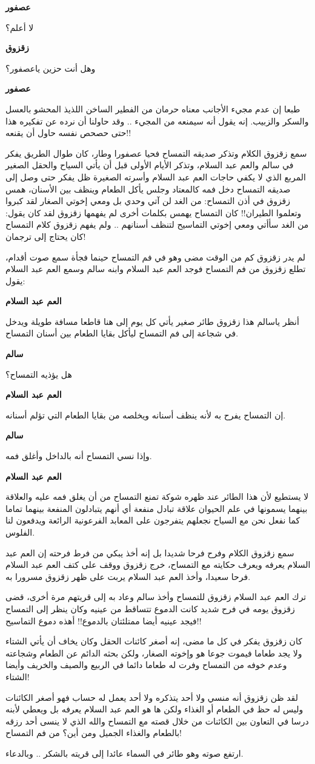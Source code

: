 \documentclass[12pt]{article}
\newlength{\SpeakerGutter}
\newlength{\DialogueGap}
\newlength{\StoryBodyWidth}
\newcommand{\Narration}[1]{%
  \par
  \noindent
  \begin{minipage}[t]{\StoryBodyWidth}
    \RaggedLeft
    #1
  \end{minipage}
  \par
}
\newcommand{\DialogueLine}[2]{%
  \par\addvspace{0.75\baselineskip}
  \noindent
  \begin{minipage}[t]{\SpeakerGutter}
    \RaggedLeft
    \bfseries #1
  \end{minipage}%
  \hspace{\DialogueGap}%
  \begin{minipage}[t]{\StoryBodyWidth}
    \RaggedLeft
    #2
  \end{minipage}%
  \par
}
\newcommand{\TextOnlyPage}[1]{%
  \clearpage
  \thispagestyle{empty}
  \vspace*{2mm}
  #1
  \clearpage
}
\begin{document}
\TextOnlyPage{%
  \DialogueLine{عصفور}{لا أعلم؟}
  \DialogueLine{زقزوق}{وهل أنت حزين ياعصفور؟}
  \DialogueLine{عصفور}{طبعا إن عدم مجيء الأجانب معناه حرمان من الفطير الساخن اللذيذ المحشو بالعسل والسكر والزبيب. إنه يقول أنه سيمنعه من المجيء .. وقد حاولنا أن نرده عن تفكيره هذا حتى حصحص نفسه حاول أن يقنعه!!}
  \Narration{سمع زقزوق الكلام وتذكر صديقه التمساح فحيا عصفورا وطار، كان طوال الطريق يفكر في سالم والعم عبد السلام، وتذكر الأيام الأولى قبل أن يأتي السياح والحقل الصغير المربع الذي لا يكفي حاجات العم عبد السلام وأسرته الصغيرة ظل يفكر حتى وصل إلى صديقه التمساح دخل فمه كالمعتاد وجلس يأكل الطعام وينظف بين الأسنان، همس زقزوق في أذن التمساح: من الغد لن آتي وحدي بل ومعي إخوتي الصغار لقد كبروا وتعلموا الطيران!! كان التمساح يهمس بكلمات أخرى لم يفهمها زقزوق لقد كان يقول: من الغد سأأتي ومعي إخوتي التماسيح لتنظف أسنانهم .. ولم يفهم زقزوق كلام التمساح كان يحتاج إلى ترجمان!}
  \Narration{لم يدر زقزوق كم من الوقت مضى وهو في فم التمساح حينما فجأة سمع صوت أقدام، تطلع زقزوق من فم التمساح فوجد العم عبد السلام وابنه سالم وسمع العم عبد السلام يقول:}
  \DialogueLine{العم عبد السلام}{أنظر ياسالم هذا زقزوق طائر صغير يأتي كل يوم إلى هنا قاطعا مسافة طويلة ويدخل في شجاعة إلى فم التمساح ليأكل بقايا الطعام بين أسنان التمساح.}
  \DialogueLine{سالم}{هل يؤذيه التمساح؟}
  \DialogueLine{العم عبد السلام}{إن التمساح يفرح به لأنه ينظف أسنانه ويخلصه من بقايا الطعام التي تؤلم أسنانه.}
}

\TextOnlyPage{%
  \DialogueLine{سالم}{وإذا نسي التمساح أنه بالداخل وأغلق فمه.}
  \DialogueLine{العم عبد السلام}{لا يستطيع لأن هذا الطائر عند ظهره شوكة تمنع التمساح من أن يغلق فمه عليه والعلاقة بينهما يسمونها في علم الحيوان علاقة تبادل منفعة أي أنهم يتبادلون المنفعة بينهما تماما كما نفعل نحن مع السياح نجعلهم يتفرجون على المعابد الفرعونية الرائعة ويدفعون لنا الفلوس.}
  \Narration{سمع زقزوق الكلام وفرح فرحا شديدا بل إنه أخذ يبكي من فرط فرحته إن العم عبد السلام يعرفه ويعرف حكايته مع التمساح، خرج زقزوق ووقف على كتف العم عبد السلام فرحا سعيدا، وأخذ العم عبد السلام يربت على ظهر زقزوق مسرورا به.}
  \Narration{ترك العم عبد السلام زقزوق للتمساح وأخذ سالم وعاد به إلى قريتهم مرة أخرى، قضى زقزوق يومه في فرح شديد كانت الدموع تتساقط من عينيه وكان ينظر إلى التمساح فيجد عينيه أيضا ممتلئتان بالدموع!! أهذه دموع التماسيح!!}
  \Narration{كان زقزوق يفكر في كل ما مضى، إنه أصغر كائنات الحقل وكان يخاف أن يأتي الشتاء ولا يجد طعاما فيموت جوعا هو وإخوته الصغار، ولكن بحثه الدائم عن الطعام وشجاعته وعدم خوفه من التمساح وفرت له طعاما دائما في الربيع والصيف والخريف وأيضا الشتاء!}
  \Narration{لقد ظن زقزوق أنه منسي ولا أحد يتذكره ولا أحد يعمل له حساب فهو أصغر الكائنات وليس له حظ في الطعام أو الغذاء ولكن ها هو العم عبد السلام يعرفه بل ويعطي لأبنه درسا في التعاون بين الكائنات من خلال قصته مع التمساح والله الذي لا ينسى أحد رزقه بالطعام والغذاء الجميل ومن أين؟ من فم التمساح!}
  \Narration{ارتفع صوته وهو طائر في السماء عائدا إلى قريته بالشكر .. وبالدعاء.}
}
\end{document}
